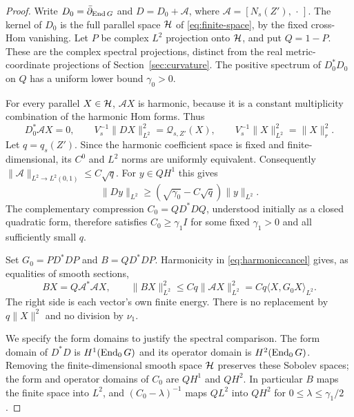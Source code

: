\begin{proof}
Write $D_0=\bar\partial_{\operatorname{End} G}$ and
$D=D_0+\mathcal A$, where $\mathcal A=[N_s(Z'),\,\cdot\,]$.
The kernel of $D_0$ is the full parallel space $\mathcal H$ of
\eqref{eq:finite-space}, by the fixed cross-Hom vanishing.
Let $P$ be complex $L^2$ projection onto $\mathcal H$, and put $Q=1-P$.
These are the complex spectral projections, distinct from the
real metric-coordinate projections of Section~\ref{sec:curvature}.
The positive spectrum of $D_0^*D_0$ on $Q$ has a uniform lower
bound $\gamma_0>0$.

For every parallel $X\in\mathcal H$, $\mathcal AX$ is harmonic,
because it is a constant multiplicity combination of the harmonic
Hom forms. Thus
\begin{equation}\label{eq:harmoniccancel}
D_0^*\mathcal AX=0,\qquad
V_s^{-1}\|DX\|_{L^2}^2=\mathcal Q_{s,Z'}(X),\qquad
V_s^{-1}\|X\|_{L^2}^2=\|X\|_r^2.
\end{equation}
Let $q=q_s(Z')$. Since the harmonic coefficient space is fixed and
finite-dimensional, its $C^0$ and $L^2$ norms are uniformly
equivalent. Consequently
$\|\mathcal A\|_{L^2\to L^2(0,1)}\le C\sqrt q$.
For $y\in QH^1$ this gives
\[
\|Dy\|_{L^2}\ge(\sqrt{\gamma_0}-C\sqrt q)\|y\|_{L^2}.
\]
The complementary compression $C_0=QD^*DQ$, understood initially
as a closed quadratic form, therefore satisfies $C_0\ge\gamma_1I$
for some fixed $\gamma_1>0$ and all sufficiently small $q$.

Set $G_0=PD^*DP$ and $B=QD^*DP$. Harmonicity in
\eqref{eq:harmoniccancel} gives, as equalities of smooth sections,
\begin{equation}\label{eq:relativecoupling}
BX=Q\mathcal A^*\mathcal AX,\qquad
\|BX\|_{L^2}^2\le Cq\|\mathcal AX\|_{L^2}^2
=Cq\langle X,G_0X\rangle_{L^2}.
\end{equation}
The right side is each vector's own finite energy. There is no
replacement by $q\|X\|^2$ and no division by $\nu_1$.

We specify the form domains to justify the spectral comparison.
The form domain of $D^*D$ is $H^1(\operatorname{End}_0G)$ and its operator
domain is $H^2(\operatorname{End}_0G)$. Removing the finite-dimensional smooth
space $\mathcal H$ preserves these Sobolev spaces; the form and operator
domains of $C_0$ are $QH^1$ and $QH^2$. In particular $B$ maps
the finite space into $L^2$, and $(C_0-\lambda)^{-1}$ maps $QL^2$
into $QH^2$ for $0\le\lambda\le\gamma_1/2$.


\end{proof}
